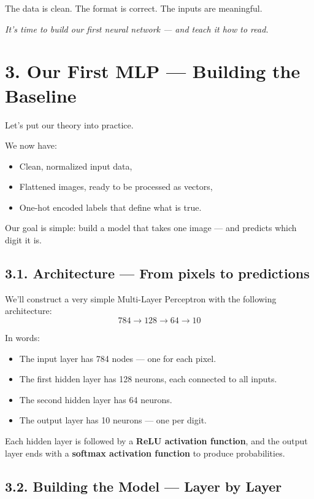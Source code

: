 \documentclass[11pt]{article}
\begin{document}
\bigskip

The data is clean. The format is correct. The inputs are meaningful.

\begin{center}
\textit{It’s time to build our first neural network — and teach it how to read.}
\end{center}

\section*{3. Our First MLP — Building the Baseline}

Let’s put our theory into practice.

We now have:
\begin{itemize}
    \item Clean, normalized input data,
    \item Flattened images, ready to be processed as vectors,
    \item One-hot encoded labels that define what is true.
\end{itemize}

Our goal is simple: build a model that takes one image — and predicts which digit it is.

\subsection*{3.1. Architecture — From pixels to predictions}

We’ll construct a very simple Multi-Layer Perceptron with the following architecture:
\[
784 \rightarrow 128 \rightarrow 64 \rightarrow 10
\]

In words:
\begin{itemize}
    \item The input layer has 784 nodes — one for each pixel.
    \item The first hidden layer has 128 neurons, each connected to all inputs.
    \item The second hidden layer has 64 neurons.
    \item The output layer has 10 neurons — one per digit.
\end{itemize}

Each hidden layer is followed by a \textbf{ReLU activation function}, and the output layer ends with a \textbf{softmax activation function} to produce probabilities.

\subsection*{3.2. Building the Model — Layer by Layer}
\end{document}
